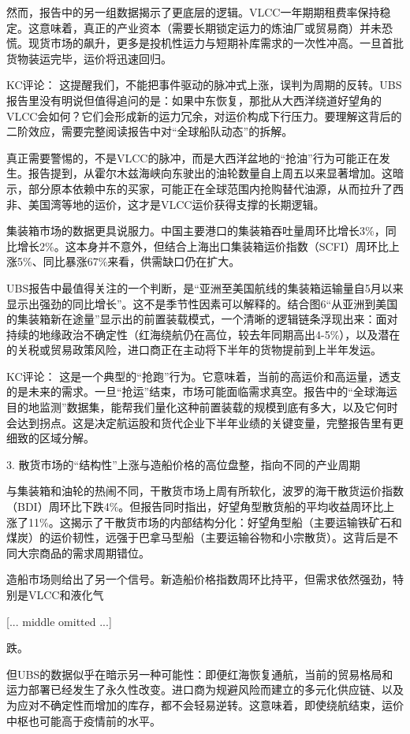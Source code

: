\documentclass[11pt]{ctexart}
\begin{document}
然而，报告中的另一组数据揭示了更底层的逻辑。VLCC一年期期租费率保持稳定。这意味着，真正的产业资本（需要长期锁定运力的炼油厂或贸易商）并未恐慌。现货市场的飙升，更多是投机性运力与短期补库需求的一次性冲高。一旦首批货物装运完毕，运价将迅速回归。

KC评论： 这提醒我们，不能把事件驱动的脉冲式上涨，误判为周期的反转。UBS报告里没有明说但值得追问的是：如果中东恢复，那批从大西洋绕道好望角的VLCC会如何？它们会形成新的运力冗余，对运价构成下行压力。要理解这背后的二阶效应，需要完整阅读报告中对“全球船队动态”的拆解。

真正需要警惕的，不是VLCC的脉冲，而是大西洋盆地的“抢油”行为可能正在发生。报告提到，从霍尔木兹海峡向东驶出的油轮数量自上周五以来显著增加。这暗示，部分原本依赖中东的买家，可能正在全球范围内抢购替代油源，从而拉升了西非、美国湾等地的运价，这才是VLCC运价获得支撑的长期逻辑。

集装箱市场的数据更具说服力。中国主要港口的集装箱吞吐量周环比增长3\%，同比增长2\%。这本身并不意外，但结合上海出口集装箱运价指数（SCFI）周环比上涨5\%、同比暴涨67\%来看，供需缺口仍在扩大。

UBS报告中最值得关注的一个判断，是“亚洲至美国航线的集装箱运输量自5月以来显示出强劲的同比增长”。这不是季节性因素可以解释的。结合图6“从亚洲到美国的集装箱新在途量”显示出的前置装载模式，一个清晰的逻辑链条浮现出来：面对持续的地缘政治不确定性（红海绕航仍在高位，较去年同期高出4-5\%），以及潜在的关税或贸易政策风险，进口商正在主动将下半年的货物提前到上半年发运。

KC评论： 这是一个典型的“抢跑”行为。它意味着，当前的高运价和高运量，透支的是未来的需求。一旦“抢运”结束，市场可能面临需求真空。报告中的“全球海运目的地监测”数据集，能帮我们量化这种前置装载的规模到底有多大，以及它何时会达到拐点。这是决定航运股和货代企业下半年业绩的关键变量，完整报告里有更细致的区域分解。

3. 散货市场的“结构性”上涨与造船价格的高位盘整，指向不同的产业周期

与集装箱和油轮的热闹不同，干散货市场上周有所软化，波罗的海干散货运价指数（BDI）周环比下跌4\%。但报告同时指出，好望角型散货船的平均收益周环比上涨了11\%。这揭示了干散货市场的内部结构分化：好望角型船（主要运输铁矿石和煤炭）的运价韧性，远强于巴拿马型船（主要运输谷物和小宗散货）。这背后是不同大宗商品的需求周期错位。

造船市场则给出了另一个信号。新造船价格指数周环比持平，但需求依然强劲，特别是VLCC和液化气

[... middle omitted ...]

跌。

但UBS的数据似乎在暗示另一种可能性：即便红海恢复通航，当前的贸易格局和运力部署已经发生了永久性改变。进口商为规避风险而建立的多元化供应链、以及为应对不确定性而增加的库存，都不会轻易逆转。这意味着，即使绕航结束，运价中枢也可能高于疫情前的水平。
\end{document}
